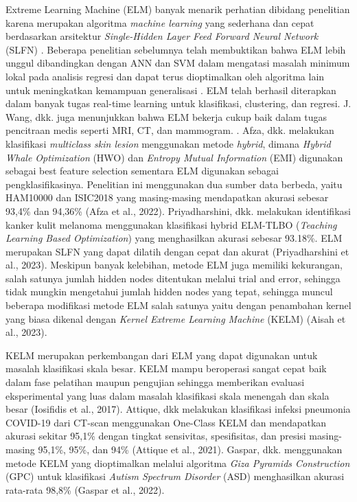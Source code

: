     Extreme Learning Machine (ELM) banyak menarik perhatian dibidang penelitian karena merupakan algoritma \textit{machine learning} yang sederhana dan cepat berdasarkan arsitektur \textit{Single-Hidden Layer Feed Forward Neural Network} (SLFN) \autocite{Li2022}. Beberapa penelitian sebelumnya telah membuktikan bahwa ELM lebih unggul dibandingkan dengan ANN dan SVM dalam mengatasi masalah minimum lokal pada analisis regresi dan dapat terus dioptimalkan oleh algoritma lain untuk meningkatkan kemampuan generalisasi \autocite{Kardani2022,Yaseen2018}. ELM telah berhasil diterapkan dalam banyak tugas real-time learning untuk klasifikasi, clustering, dan regresi. J. Wang, dkk. juga menunjukkan bahwa ELM bekerja cukup baik dalam tugas pencitraan medis seperti MRI, CT, dan mammogram. \autocite{Wang2022}. Afza, dkk. melakukan klasifikasi \textit{multiclass skin lesion} menggunakan metode \textit{hybrid}, dimana \textit{Hybrid Whale Optimization} (HWO) dan \textit{Entropy Mutual Information} (EMI) digunakan sebagai best feature selection sementara ELM digunakan sebagai pengklasifikasinya. Penelitian ini menggunakan dua sumber data berbeda, yaitu HAM10000 dan ISIC2018 yang masing-masing mendapatkan akurasi sebesar 93,4\% dan 94,36\% (Afza et al., 2022). Priyadharshini, dkk. melakukan identifikasi kanker kulit melanoma menggunakan klasifikasi hybrid ELM-TLBO (\textit{Teaching Learning Based Optimization}) yang menghasilkan akurasi sebesar 93.18\%. ELM merupakan SLFN yang dapat dilatih dengan cepat dan akurat (Priyadharshini et al., 2023). Meskipun banyak kelebihan, metode ELM juga memiliki kekurangan, salah satunya jumlah hidden nodes ditentukan melalui trial and error, sehingga tidak mungkin mengetahui jumlah hidden nodes yang tepat, sehingga muncul beberapa modifikasi metode ELM salah satunya yaitu dengan penambahan kernel yang biasa dikenal dengan \textit{Kernel Extreme Learning Machine} (KELM) (Aisah et al., 2023).

    KELM merupakan perkembangan dari ELM yang dapat digunakan untuk masalah klasifikasi skala besar. KELM mampu beroperasi sangat cepat baik dalam fase pelatihan maupun pengujian sehingga memberikan evaluasi eksperimental yang luas dalam masalah klasifikasi skala menengah dan skala besar (Iosifidis et al., 2017). Attique, dkk melakukan klasifikasi infeksi pneumonia COVID-19 dari CT-scan menggunakan One-Class KELM dan mendapatkan akurasi sekitar 95,1\% dengan tingkat sensivitas, spesifisitas, dan presisi masing-masing 95,1\%, 95\%, dan 94\% (Attique et al., 2021). Gaspar, dkk. menggunakan metode KELM yang dioptimalkan melalui algoritma \textit{Giza Pyramids Construction} (GPC) untuk klasifikasi \textit{Autism Spectrum Disorder} (ASD) menghasilkan akurasi rata-rata 98,8\% (Gaspar et al., 2022).

